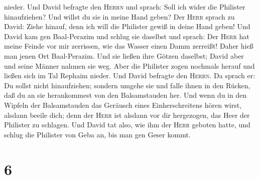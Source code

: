 nieder.  Und David befragte den \textsc{Herrn} und
sprach: Soll ich wider die Philister hinaufziehen? Und willst du sie in
meine Hand geben? Der \textsc{Herr} sprach zu David: Ziehe hinauf, denn
ich will die Philister gewiß in deine Hand geben!  Und
David kam gen Baal-Perazim und schlug sie daselbst und sprach: Der
\textsc{Herr} hat meine Feinde vor mir zerrissen, wie das Wasser einen
Damm zerreißt! Daher hieß man jenen Ort Baal-Perazim. 
Und sie ließen ihre Götzen daselbst; David aber und seine Männer nahmen
sie weg.  Aber die Philister zogen nochmals herauf und
ließen sich im Tal Rephaim nieder.  Und David befragte
den \textsc{Herrn}. Da sprach er: Du sollst nicht hinaufziehen; sondern
umgehe sie und falle ihnen in den Rücken, daß du an sie herankommest von
den Balsamstauden her.  Und wenn du in den Wipfeln der
Balsamstauden das Geräusch eines Einherschreitens hören wirst, alsdann
beeile dich; denn der \textsc{Herr} ist alsdann vor dir hergezogen, das
Heer der Philister zu schlagen.  Und David tat also, wie
ihm der \textsc{Herr} geboten hatte, und schlug die Philister von Geba
an, bis man gen Geser kommt.

\hypertarget{section-5}{%
\section{6}\label{section-5}}

